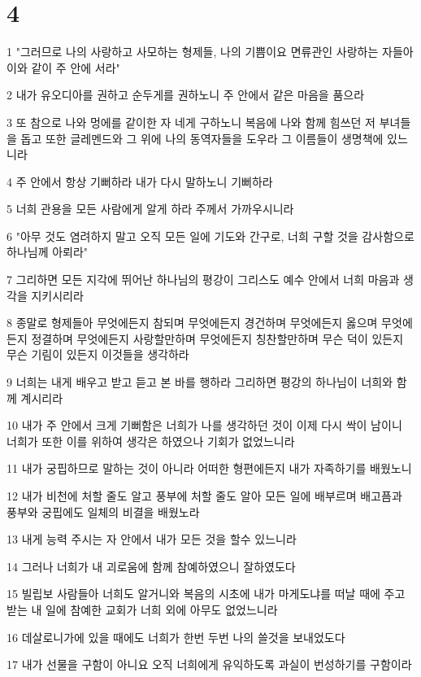 \chapter{4}

\par 1 "그러므로 나의 사랑하고 사모하는 형제들, 나의 기쁨이요 면류관인 사랑하는 자들아 이와 같이 주 안에 서라"
\par 2 내가 유오디아를 권하고 순두게를 권하노니 주 안에서 같은 마음을 품으라
\par 3 또 참으로 나와 멍에를 같이한 자 네게 구하노니 복음에 나와 함께 힘쓰던 저 부녀들을 돕고 또한 글레멘드와 그 위에 나의 동역자들을 도우라 그 이름들이 생명책에 있느니라
\par 4 주 안에서 항상 기뻐하라 내가 다시 말하노니 기뻐하라
\par 5 너희 관용을 모든 사람에게 알게 하라 주께서 가까우시니라
\par 6 "아무 것도 염려하지 말고 오직 모든 일에 기도와 간구로, 너희 구할 것을 감사함으로 하나님께 아뢰라"
\par 7 그리하면 모든 지각에 뛰어난 하나님의 평강이 그리스도 예수 안에서 너희 마음과 생각을 지키시리라
\par 8 종말로 형제들아 무엇에든지 참되며 무엇에든지 경건하며 무엇에든지 옳으며 무엇에든지 정결하며 무엇에든지 사랑할만하며 무엇에든지 칭찬할만하며 무슨 덕이 있든지 무슨 기림이 있든지 이것들을 생각하라
\par 9 너희는 내게 배우고 받고 듣고 본 바를 행하라 그리하면 평강의 하나님이 너희와 함께 계시리라
\par 10 내가 주 안에서 크게 기뻐함은 너희가 나를 생각하던 것이 이제 다시 싹이 남이니 너희가 또한 이를 위하여 생각은 하였으나 기회가 없었느니라
\par 11 내가 궁핍하므로 말하는 것이 아니라 어떠한 형편에든지 내가 자족하기를 배웠노니
\par 12 내가 비천에 처할 줄도 알고 풍부에 처할 줄도 알아 모든 일에 배부르며 배고픔과 풍부와 궁핍에도 일체의 비결을 배웠노라
\par 13 내게 능력 주시는 자 안에서 내가 모든 것을 할수 있느니라
\par 14 그러나 너희가 내 괴로움에 함께 참예하였으니 잘하였도다
\par 15 빌립보 사람들아 너희도 알거니와 복음의 시초에 내가 마게도냐를 떠날 때에 주고 받는 내 일에 참예한 교회가 너희 외에 아무도 없었느니라
\par 16 데살로니가에 있을 때에도 너희가 한번 두번 나의 쓸것을 보내었도다
\par 17 내가 선물을 구함이 아니요 오직 너희에게 유익하도록 과실이 번성하기를 구함이라

